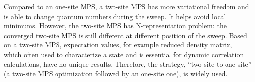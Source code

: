 Compared to an one-site MPS, a two-site MPS has more variational freedom and is able to change quantum numbers during the sweep. It helps avoid local minimums. However, the two-site MPS has N-representation problem: the converged two-site MPS is still different at different position of the sweep.\cite{zgid_obtaining_2008} Based on a two-site MPS, expectation values, for example reduced density matrix, which often used to characterize a state and is essential for dynamic correlation calculations, have no unique results. 
Therefore, the strategy, ``two-site to one-site'' (a two-site MPS optimization followed by an one-site one), is widely used\cite{olivares-amaya_ab-initio_2015}. 
















